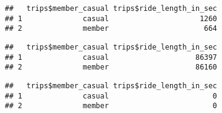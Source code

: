 \documentclass[
]{article}
\newenvironment{Shaded}{\begin{snugshade}}{\end{snugshade}}
\newcommand{\AttributeTok}[1]{\textcolor[rgb]{0.77,0.63,0.00}{#1}}
\newcommand{\FunctionTok}[1]{\textcolor[rgb]{0.00,0.00,0.00}{#1}}
\newcommand{\NormalTok}[1]{#1}
\newcommand{\SpecialCharTok}[1]{\textcolor[rgb]{0.00,0.00,0.00}{#1}}
\begin{document}
\begin{verbatim}
##   trips$member_casual trips$ride_length_in_sec
## 1              casual                     1260
## 2              member                      664
\end{verbatim}

\begin{Shaded}
\end{Shaded}

\begin{verbatim}
##   trips$member_casual trips$ride_length_in_sec
## 1              casual                    86397
## 2              member                    86160
\end{verbatim}

\begin{Shaded}
\end{Shaded}

\begin{verbatim}
##   trips$member_casual trips$ride_length_in_sec
## 1              casual                        0
## 2              member                        0
\end{verbatim}

\begin{Shaded}
\end{Shaded}
\end{document}
